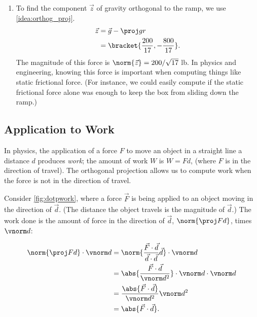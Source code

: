 \begin{example}
\begin{enumerate}
	\item		To find the component $\vec z$ of gravity orthogonal to the ramp, we use \autoref{idea:orthog_proj}.\vspace{-.5\baselineskip}
	\begin{align*}
	\vec z &= \vec g - \proj gr \\
	&=\bracket{\frac{200}{17},-\frac{800}{17}}%
	.
	\end{align*}
	The magnitude of this force is $\norm{\vec z}=200/\sqrt{17}%
	$ lb. In physics and engineering, knowing this force is important when computing things like static frictional force. (For instance, we could easily compute if the static frictional force alone was enough to keep the box from sliding down the ramp.)
\end{enumerate}
\end{example}

\subsection{Application to Work}

In physics, the application of a force $F$ to move an object in a straight line a distance $d$ produces \emph{work}; the amount of work $W$ is $W=Fd$, (where $F$ is in the direction of travel). The orthogonal projection allows us to compute work when the force is not in the direction of travel.

Consider \autoref{fig:dotpwork}, where a force $\vec F$ is being applied to an object moving in the direction of $\vec d$. (The distance the object travels is the magnitude of $\vec d$.) The work done is the amount of force in the direction of $\vec d$, $\norm{\proj Fd}$, times $\vnorm d$:


\begin{align*}
\norm{\proj Fd}\cdot\vnorm d
 &= \norm{\frac{\vec F\cdot\vec d}{\vec d\cdot\vec d}\vec d}\cdot \vnorm d \\
		&= \abs{\frac{\vec F\cdot\vec d}{\vnorm d^2}}\cdot \vnorm d\cdot\vnorm d\\
		&= \frac{\abs{\vec F\cdot\vec d}}{\vnorm d^2}\vnorm d^2\\
		&= \abs{\vec F\cdot\vec d}.
\end{align*}

